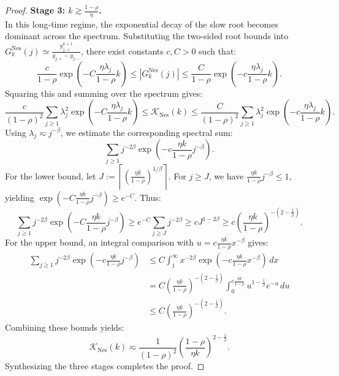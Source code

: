 \begin{proof}
\textbf{Stage 3: $k \gtrsim \frac{1-\rho}{\eta}$.} \\
In this long-time regime, the exponential decay of the slow root becomes dominant across the spectrum. Substituting the two-sided root bounds into $G_k^{\mathrm{Nes}}(j) \simeq \frac{y_{j,+}^{k+1}}{y_{j,+}-y_{j,-}}$, there exist constants $c, C > 0$ such that:
\begin{equation}
\label{eq:nes_green_sgd_pointwise}
    \frac{c}{1-\rho}
    \exp\left(-C\frac{\eta\lambda_j}{1-\rho}k\right)
    \le
    |G_k^{\mathrm{Nes}}(j)|
    \le
    \frac{C}{1-\rho}
    \exp\left(-c\frac{\eta\lambda_j}{1-\rho}k\right).
\end{equation}
Squaring this and summing over the spectrum gives:
\begin{equation}
\label{eq:nes_kernel_sgd_spectral_comparison}
    \frac{c}{(1-\rho)^2}
    \sum_{j\ge1}\lambda_j^2
    \exp\left(-C\frac{\eta\lambda_j}{1-\rho}k\right)
    \le
    \mathcal K_{\mathrm{Nes}}(k)
    \le
    \frac{C}{(1-\rho)^2}
    \sum_{j\ge1}\lambda_j^2
    \exp\left(-c\frac{\eta\lambda_j}{1-\rho}k\right).
\end{equation}
Using $\lambda_j \eqsim j^{-\beta}$, we estimate the corresponding spectral sum:
\[
    \sum_{j\ge1}j^{-2\beta}
    \exp\left(-c\frac{\eta k}{1-\rho}j^{-\beta}\right).
\]
For the lower bound, let $J:=\left\lceil \left(\frac{\eta k}{1-\rho}\right)^{1/\beta}\right\rceil$. For $j\ge J$, we have $\frac{\eta k}{1-\rho}j^{-\beta}\le1$, yielding $\exp\left(-C\frac{\eta k}{1-\rho}j^{-\beta}\right)\ge e^{-C}$. Thus:
\[
    \sum_{j\ge1}j^{-2\beta}
    \exp\left(-C\frac{\eta k}{1-\rho}j^{-\beta}\right)
    \ge
    e^{-C}\sum_{j\ge J}j^{-2\beta}
    \ge
    c J^{1-2\beta}
    \ge
    c\left(\frac{\eta k}{1-\rho}\right)^{-\left(2-\frac1\beta\right)}.
\]
For the upper bound, an integral comparison with $u=c\frac{\eta k}{1-\rho}x^{-\beta}$ gives:
\begin{align*}
    \sum_{j\ge1}j^{-2\beta}
    \exp\left(-c\frac{\eta k}{1-\rho}j^{-\beta}\right)
    &\le
    C\int_1^\infty x^{-2\beta}
    \exp\left(-c\frac{\eta k}{1-\rho}x^{-\beta}\right)\,dx \\
    &=
    C\left(\frac{\eta k}{1-\rho}\right)^{-\left(2-\frac1\beta\right)}
    \int_0^{c\frac{\eta k}{1-\rho}}u^{1-\frac1\beta}e^{-u}\,du \\
    &\le
    C\left(\frac{\eta k}{1-\rho}\right)^{-\left(2-\frac1\beta\right)}.
\end{align*}
Combining these bounds yields:
\[
    \mathcal K_{\mathrm{Nes}}(k)
    \eqsim
    \frac{1}{(1-\rho)^2}
    \left(\frac{1-\rho}{\eta k}\right)^{2-\frac1\beta}.
\]
Synthesizing the three stages completes the proof.
\end{proof}

